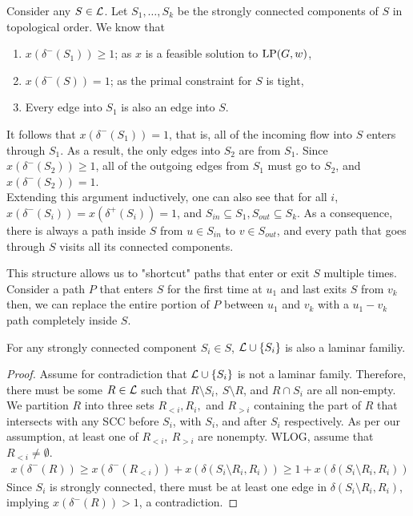 
	Consider any $S\in \mathcal{L}$. Let $S_1,\dots, S_k$ be the strongly connected components of $S$ in topological order.
	We know that
	\begin{enumerate}
		\item $x(\delta^-(S_1)) \geqslant 1$; as $x$ is a feasible solution to $\textup{LP}(G,w)$,
		\item $x(\delta^-(S)) = 1$; as the primal constraint for $S$ is tight,
		\item Every edge into $S_1$ is also an edge into $S$.
	\end{enumerate}
	It follows that $x(\delta^-(S_1)) = 1$, that is, all of the incoming flow into $S$ enters through $S_1$. As a result, the only edges into $S_2$ are from $S_1$. Since $x(\delta^-(S_2))\geqslant 1$, all of the outgoing edges from $S_1$ must go to $S_2$, and $x(\delta^-(S_2)) = 1$.
	\\Extending this argument inductively, one can also see that for all $i$, $x(\delta^-(S_i)) = x(\delta^+(S_i)) = 1$, and $S_{in}\subseteq S_1,S_{out}\subseteq S_k$.
	As a consequence, there is always a path inside $S$ from $u\in S_{in}$ to $v\in S_{out}$, and every path that goes through $S$ visits all its connected components.

	This structure allows us to "shortcut" paths that enter or exit $S$ multiple times. Consider a path $P$ that enters $S$ for the first time at $u_1$ and last exits $S$ from $v_k$ then, we can replace the entire portion of $P$ between $u_1$ and $v_k$ with a $u_1 - v_k$ path completely inside $S$.\\
	

	\begin{lemma}\label{lemm:2:SiAgree}
		For any strongly connected component $S_i \in S$, $\mathcal{L} \cup \{S_i\}$ is also a laminar familiy.
	\end{lemma}
	\begin{proof}
		Assume for contradiction that $\mathcal{L} \cup \{S_i\}$ is not a laminar family.
		Therefore, there must be some $R \in \mathcal{L}$ such that $R\setminus S_i,\ S\setminus R$, and $R \cap S_i$ are all non-empty.
		We partition $R$ into three sets $R_{<i}, R_i,$ and $R_{>i}$ containing the part of $R$ that intersects with any SCC before $S_i$, with $S_i$, and after $S_i$ respectively. As per our assumption, at least one of $R_{<i},\ R_{>i}$ are nonempty. WLOG, assume that $R_{<i}\neq \emptyset$.
		\begin{align*}
			x(\delta^-(R)) \geqslant x(\delta^-(R_{<i})) + x(\delta(S_i\setminus R_i, R_i)) \geqslant 1 + x(\delta(S_i\setminus R_i, R_i))
		\end{align*}
		Since $S_i$ is strongly connected, there must be at least one edge in $\delta(S_i\setminus R_i, R_i)$, implying $x(\delta^-(R)) > 1$, a contradiction.
	\end{proof}

